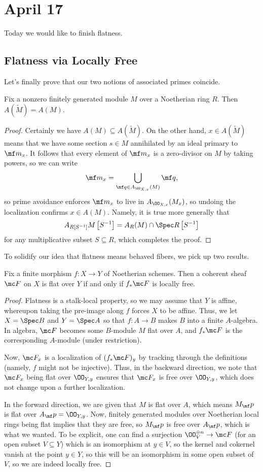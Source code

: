 \documentclass[../notes.tex]{subfiles}
\begin{document}
\section{April 17}

Today we would like to finish flatness.

\subsection{Flatness via Locally Free}
Let's finally prove that our two notions of associated primes coincide.
\begin{proposition}
	Fix a nonzero finitely generated module $M$ over a Noetherian ring $R$. Then $A(\widetilde M)=A(M)$.
\end{proposition}
\begin{proof}
	Certainly we have $A(M)\subseteq A(\widetilde M)$. On the other hand, $x\in A(\widetilde M)$ means that we have some section $s\in M$ annihilated by an ideal primary to $\mf m_x$. It follows that every element of $\mf m_x$ is a zero-divisor on $M$ by taking powers, so we can write
	\[\mf m_x=\bigcup_{\mf q\in A_{\OO_{X,x}}(M)}\mf q,\]
	so prime avoidance enforces $\mf m_x$ to live in $A_{\OO_{X,x}}(M_x)$, so undoing the localization confirms $x\in A(M)$. Namely, it is true more generally that
	\[A_{R\left[S^{-1}\right]}M\left[S^{-1}\right]=A_R(M)\cap\Spec R\left[S^{-1}\right]\]
	for any multiplicative subset $S\subseteq R$, which completes the proof.
\end{proof}
To solidify our idea that flatness means behaved fibers, we pick up two results.
\begin{proposition}
	Fix a finite morphism $f\colon X\to Y$ of Noetherian schemes. Then a coherent sheaf $\mc F$ on $X$ is flat over $Y$ if and only if $f_*\mc F$ is locally free.
\end{proposition}
\begin{proof}
	Flatness is a stalk-local property, so we may assume that $Y$ is affine, whereupon taking the pre-image along $f$ forces $X$ to be affine. Thus, we let $X=\Spec B$ and $Y=\Spec A$ so that $f\colon A\to B$ makes $B$ into a finite $A$-algebra. In algebra, $\mc F$ becomes some $B$-module $M$ flat over $A$, and $f_*\mc F$ is the corresponding $A$-module (under restriction).

	Now, $\mc F_x$ is a localization of $(f_*\mc F)_y$ by tracking through the definitions (namely, $f$ might not be injective). Thus, in the backward direction, we note that $\mc F_x$ being flat over $\OO_{Y,y}$ ensures that $\mc F_x$ is free over $\OO_{Y,y}$, which does not change upon a further localization.

	In the forward direction, we are given that $M$ is flat over $A$, which means $M_\mf p$ is flat over $A_\mf p=\OO_{Y,y}$. Now, finitely generated modules over Noetherian local rings being flat implies that they are free, so $M_\mf p$ is free over $A_\mf p$, which is what we wanted. To be explicit, one can find a surjection $\OO_V^{\oplus n}\to\mc F$ (for an open subset $V\subseteq Y$) which is an isomorphism at $y\in V$, so the kernel and cokernel vanish at the point $y\in Y$, so this will be an isomorphism in some open subset of $V$, so we are indeed locally free.
\end{proof}
\end{document}
